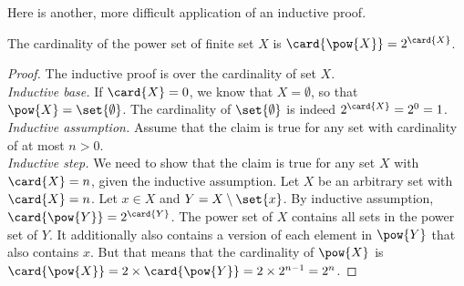\documentclass[nobib,nofonts]{tufte-handout}
\begin{document}
Here is another, more difficult application of an inductive proof.

\begin{proposition}
  The cardinality of the power set of finite set $X$ is $\card{\pow{X}} = 2^{\card{X}}$.
\end{proposition}

\begin{proof}
  The inductive proof is over the cardinality of set $X$.\\
  \emph{Inductive base.} If $\card{X} = 0$, we know that $X = \emptyset$, so that $\pow{X} = \set{\emptyset}$. The cardinality of $\set{\emptyset}$ is indeed $2^{\card{X}} = 2^{0} = 1$. \\
  \emph{Inductive assumption.} Assume that the claim is true for any set with cardinality of at most $n > 0$.\\
  \emph{Inductive step.} We need to show that the claim is true for any set $X$ with $\card{X} = n$, given the inductive assumption.
  Let $X$ be an arbitrary set with $\card{X} = n$.
  Let $x \in X$ and $Y = X \setminus \set{x}$. By inductive assumption, $\card{\pow{Y}} = 2^{\card{Y}}$.
  The power set of $X$ contains all sets in the power set of $Y$.
  It additionally also contains a version of each element in $\pow{Y}$ that also contains $x$.
  But that means that the cardinality of $\pow{X}$ is $\card{\pow{X}} = 2 \times \card{\pow{Y}} = 2 \times 2^{{n-1}} = 2^{n}$.
\end{proof}
\end{document}
